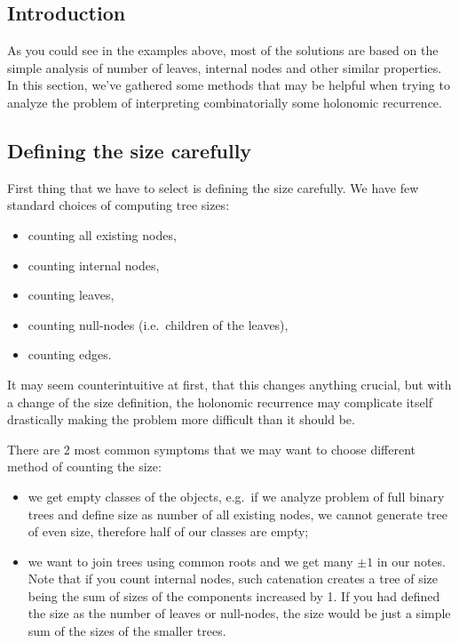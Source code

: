 \documentclass[final]{article}
\theoremstyle{definition}
\theoremstyle{definition}
\theoremstyle{remark}
\begin{document}
\subsection{Introduction}%
\label{sub:introduction}

As you could see in the examples above, most of the solutions are based on the simple analysis of number of leaves, internal nodes and other similar properties. In this section, we've gathered some methods that may be helpful when trying to analyze the problem of interpreting combinatorially some holonomic recurrence.

\subsection{Defining the size carefully}%
\label{sub:defining_the_size_carefully}

First thing that we have to select is defining the size carefully. We have few standard choices of computing tree sizes:
\begin{itemize}
    \item counting all existing nodes,
    \item counting internal nodes,
    \item counting leaves,
    \item counting null-nodes (i.e.\ children of the leaves),
    \item counting edges.
\end{itemize}

It may seem counterintuitive at first, that this changes anything crucial, but with a change of the size definition, the holonomic recurrence may complicate itself drastically making the problem more difficult than it should be.

There are 2 most common symptoms that we may want to choose different method of counting the size:
\begin{itemize}
    \item we get empty classes of the objects, e.g.\ if we analyze problem of full binary trees and define size as number of all existing nodes, we cannot generate tree of even size, therefore half of our classes are empty;
    \item we want to join trees using common roots and we get many \(\pm1\) in our notes. Note that if you count internal nodes, such catenation creates a tree of size being the sum of sizes of the components increased by 1. If you had defined the size as the number of leaves or null-nodes, the size would be just a simple sum of the sizes of the smaller trees.
\end{itemize}
\end{document}
